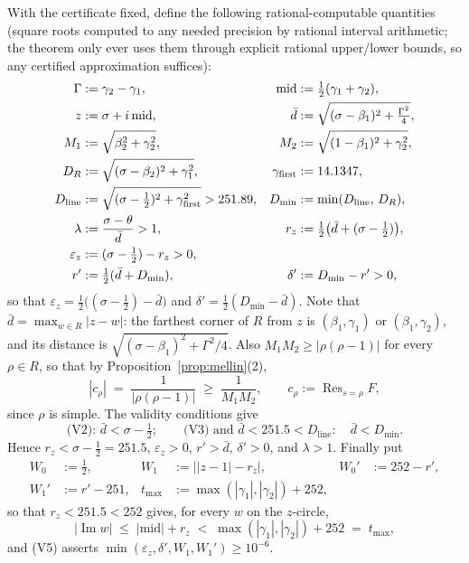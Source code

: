 \documentclass[11pt]{amsart}
\numberwithin{equation}{section}
\newcommand{\res}{\operatorname{Res}}
\newcommand{\im}{\operatorname{Im}}
\newcommand{\Sig}{\sigma}
\newcommand{\dbar}{\bar{d}}
\begin{document}
With the certificate fixed, define the following rational-computable
quantities (square roots computed to any needed precision by rational
interval arithmetic; the theorem only ever uses them through explicit
rational upper/lower bounds, so any certified approximation suffices):
\begin{align}
\Gamma &:= \gamma_2 - \gamma_1, &
\mathrm{mid} &:= \tfrac12(\gamma_1 + \gamma_2), \notag\\
z &:= \Sig + i\,\mathrm{mid}, &
\dbar &:= \sqrt{(\Sig - \beta_1)^2 + \tfrac{\Gamma^2}{4}}, \notag\\
M_1 &:= \sqrt{\beta_2^2 + \gamma_2^2}, &
M_2 &:= \sqrt{(1-\beta_1)^2 + \gamma_2^2}, \notag\\
D_R &:= \sqrt{(\Sig - \beta_2)^2 + \gamma_1^2}, &
\gamma_{\mathrm{first}} &:= 14.1347, \notag\\
D_{\mathrm{line}} &:= \sqrt{(\Sig - \tfrac12)^2 +
\gamma_{\mathrm{first}}^2} > 251.89, &
D_{\min} &:= \min(D_{\mathrm{line}},\, D_R), \notag\\
\lambda &:= \frac{\Sig - \theta}{\dbar} > 1, &
r_z &:= \tfrac12\bigl(\dbar + (\Sig - \tfrac12)\bigr), \notag\\
\varepsilon_z &:= (\Sig-\tfrac12) - r_z > 0, \notag\\
r' &:= \tfrac12(\dbar + D_{\min}), &
\delta' &:= D_{\min} - r' > 0, \notag
\end{align}
so that $\varepsilon_z = \tfrac12\bigl((\Sig-\tfrac12) - \dbar\bigr)$
and $\delta' = \tfrac12(D_{\min} - \dbar)$.
Note that $\dbar = \max_{w \in R}|z - w|$: the farthest corner of $R$
from $z$ is $(\beta_1, \gamma_1)$ or $(\beta_1, \gamma_2)$, and its
distance is $\sqrt{(\Sig-\beta_1)^2 + \Gamma^2/4}$. Also $M_1 M_2 \ge
|\rho(\rho-1)|$ for every $\rho \in R$, so that by
Proposition~\ref{prop:mellin}(2),
\begin{equation}\label{eq:residue}
|c_{\rho}| \;=\; \frac{1}{|\rho(\rho-1)|} \;\ge\; \frac{1}{M_1 M_2},
\qquad c_\rho := \res_{s=\rho}F,
\end{equation}
since $\rho$ is simple. The validity conditions give
\[
\text{(V2): } \dbar < \Sig-\tfrac12; \qquad
\text{(V3) and } \dbar < 251.5 < D_{\mathrm{line}}:\quad
\dbar < D_{\min}.
\]
Hence $r_z < \Sig - \tfrac12 = 251.5$, $\varepsilon_z > 0$, $r' > \dbar$,
$\delta' > 0$, and $\lambda > 1$. Finally put
\begin{align*}
W_0 &:= \tfrac12, &
W_1 &:= \bigl||z-1| - r_z\bigr|, &
W_0' &:= 252 - r', \\
W_1' &:= r' - 251, &
t_{\max} &:= \max(|\gamma_1|, |\gamma_2|) + 252,
\end{align*}
so that $r_z < 251.5 < 252$ gives, for every $w$ on the $z$-circle,
\[
|\im w| \;\le\; |\mathrm{mid}| + r_z \;<\; \max(|\gamma_1|,|\gamma_2|) + 252
\;=\; t_{\max},
\]
and (V5) asserts $\min(\varepsilon_z, \delta', W_1, W_1') \ge 10^{-6}$.
\end{document}
